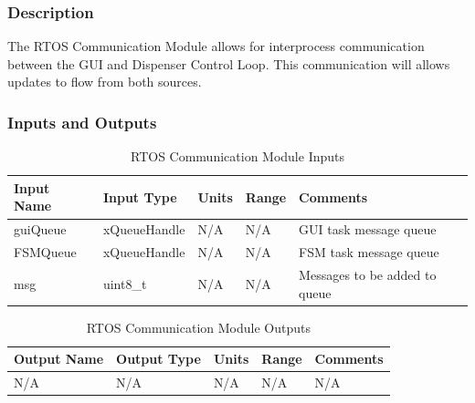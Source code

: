 \documentclass[12pt,titlepage]{article}
\begin{document}
\subsubsection*{Description}

The RTOS Communication Module allows for interprocess communication between the GUI and Dispenser Control Loop. This communication will allows updates to flow from both sources.
\pagebreak

\subsubsection*{Inputs and Outputs}

\begin{table}[htbp!]
\begin{center}
\begin{adjustbox}{max width=\textwidth}
\small
\begin{tabular}{|p{}|p{}|p{}|p{}|p{}|}
 \hline
 \textbf{Input Name} & \textbf{Input Type} & \textbf{Units} &\textbf{Range} & \textbf{Comments} \\
 \hline 
 guiQueue & xQueueHandle  & N/A & N/A & GUI task message queue \\
 \hline
 FSMQueue & xQueueHandle  & N/A & N/A & FSM task message queue \\
 \hline
 msg & uint8\_t  & N/A & N/A & Messages to be added to queue \\
 \hline
\end{tabular}
\end{adjustbox}
\end{center}
\caption{RTOS Communication Module Inputs}
\end{table}

\begin{table}[ht!]
\begin{center}
\begin{adjustbox}{max width=\textwidth}
\small
\begin{tabular}{|p{}|p{}|p{}|p{}|p{}|}
 \hline
 \textbf{Output Name} & \textbf{Output Type} & \textbf{Units} &\textbf{Range} & \textbf{Comments} \\
 \hline 
 N/A & N/A & N/A & N/A & N/A \\
 \hline
\end{tabular}
\end{adjustbox}
\end{center}
\caption{RTOS Communication Module Outputs}
\end{table}
\end{document}

